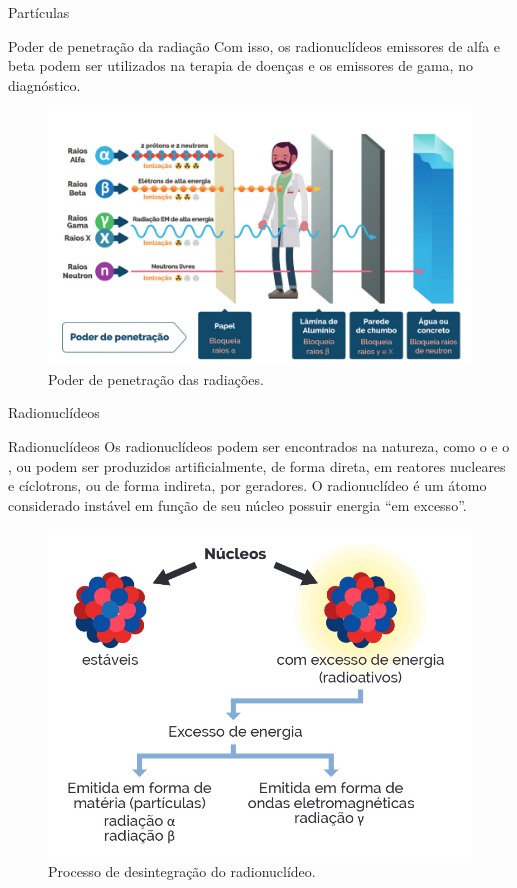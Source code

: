 \documentclass[presentation]{beamer}
\begin{document}
\begin{frame}[label={sec:orgdc27edd}]{Partículas}
\begin{block}{Poder de penetração da radiação}
Com isso, os radionuclídeos emissores de alfa e beta podem ser utilizados na terapia de doenças e os emissores de gama, no diagnóstico.
\vspace{0.0cm}
\begin{figure}[H]
\centering
\includegraphics[scale=0.28]{./poder.png}
\caption{\label{fig:org5447164}Poder de penetração das radiações.}
\end{figure}
\end{block}
\end{frame}



\begin{frame}[label={sec:orge8dde03}]{Radionuclídeos}
\begin{block}{Radionuclídeos}
Os radionuclídeos podem ser encontrados na natureza, como o   e o , ou podem ser produzidos artificialmente, de forma direta, em reatores nucleares e cíclotrons, ou de forma indireta, por geradores. O radionuclídeo é um átomo considerado instável em função de seu núcleo possuir energia “em excesso”.

\begin{figure}[H]
\centering
\includegraphics[scale=0.24]{./nucleo.png}
\caption{\label{fig:org0acf35d}Processo de desintegração do radionuclídeo.}
\end{figure}
\end{block}
\end{frame}
\end{document}
